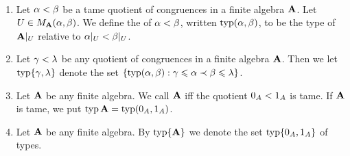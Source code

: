 \begin{definition}\
  \begin{enumerate}
\item Let $\alpha < \beta$ be a tame quotient of congruences in a finite algebra 
$\mathbf{A}$. Let $U\in M_{\mathbf{A}} (\alpha, \beta)$.  We define the \defn{type} of $\alpha < \beta$, 
written $\operatorname{typ}(\alpha,\beta)$, to be the type of $\mathbf{A}|_U$ 
relative to $\alpha|_U < \beta|_U$.
\item
Let $\gamma < \lambda$ be any quotient of congruences in a finite algebra $\mathbf{A}$. 
Then we let $\operatorname{typ}\{\gamma, \lambda\}$ denote the set
$\{\operatorname{typ}(\alpha, \beta) : \gamma \leqslant \alpha \prec \beta \leqslant \lambda\}$.
\item
Let $\mathbf{A}$ be any finite algebra. We call $\mathbf{A}$  iff the quotient 
$0_A < 1_A$ is tame. %
If $\mathbf{A}$ is tame, we put $\operatorname{typ} \mathbf{A} = \operatorname{typ}(0_A, 1_A)$.
\item Let $\mathbf{A}$ be any finite algebra. By $\operatorname{typ}\{\mathbf{A}\}$ we denote the set 
$\operatorname{typ}\{0_A,1_A\}$ of types.
  \end{enumerate}
\end{definition}



